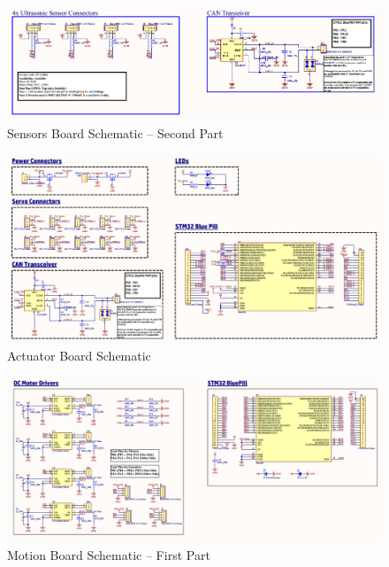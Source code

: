 \begin{figure}[h!]
	\centering
	\includegraphics[scale=0.4]{Figures/HW/schem-sensi-2.png}
	\caption{Sensors Board Schematic -- Second Part}
	\label{fig:hw-sensi-schem-2}
\end{figure}

\begin{figure}[h!]
	\centering
	\includegraphics[scale=0.4]{Figures/HW/schem-actuators.png}
	\caption{Actuator Board Schematic}
	\label{fig:hw-servo-schem}
\end{figure}

\newpage

\begin{figure}[h!]
	\centering
	\includegraphics[scale=0.4]{Figures/HW/schem-motor-1.png}
	\caption{Motion Board Schematic -- First Part}
	\label{fig:hw-motion-schem-1}
\end{figure}


